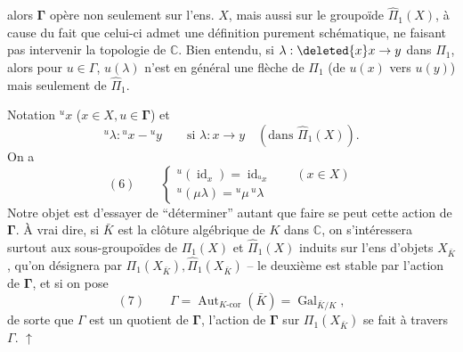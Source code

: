 alors $\mathbf{\Gamma}$ opère non seulement sur  l'ens. $X$, mais aussi sur le groupoïde $\widehat\Pi_1(X)$, à cause du fait que celui-ci admet une définition purement schématique, ne faisant pas intervenir la topologie de $\mathbb C$. Bien entendu, si $\lambda:\deleted{x} x\to y$ dans $\Pi_1$, alors pour $u\in\Gamma$, $u(\lambda)$ n'est  en général une flèche de $\Pi_1$ (de $u(x)$ vers $u(y)$) mais seulement de $\widehat\Pi_1$.

 Notation ${}^ux$ ($x\in X,u\in\mathbf{\Gamma}$) et 
\[
{}^u\lambda:{}^ux-{}^uy\qquad\text{si }\lambda:x\to y\quad(\text{dans }\widehat\Pi_1(X)).
\]
On a
\[
(6)\qquad\begin{cases}
{}^u(\operatorname{id}_x)=\operatorname{id}_{{}^ux}\qquad(x\in X)\\
{}^u(\mu\lambda)={}^u\mu\,{}^u\lambda
\end{cases}
\]
Notre objet est d'essayer de ``déterminer'' autant que faire se peut cette action de $\mathbf{\Gamma}$. À vrai dire, si $\bar K$ est la clôture algébrique de $K$ dans $\mathbb C$, on s'intéressera surtout aux sous-groupoïdes de $\Pi_1(X)$ et $\widehat\Pi_1(X)$ induits sur l'ens d'objets $X_{\bar K}$, qu'on désignera par $\Pi_1(X_{\bar K}),\widehat\Pi_1(X_{\bar K})$ -- le deuxième est stable par l'action de $\mathbf{\Gamma}$, et si on pose
\[
(7)\qquad\Gamma=\operatorname{Aut}_{K\text{-cor}}(\bar K)=\operatorname{Gal}_{\bar K/K},
\]
de sorte que $\Gamma$ est un quotient de $\mathbf{\Gamma}$, l'action de $\mathbf{\Gamma}$ sur $\Pi_1(X_{\bar K})$ se fait à travers $\Gamma$. $\uparrow$
